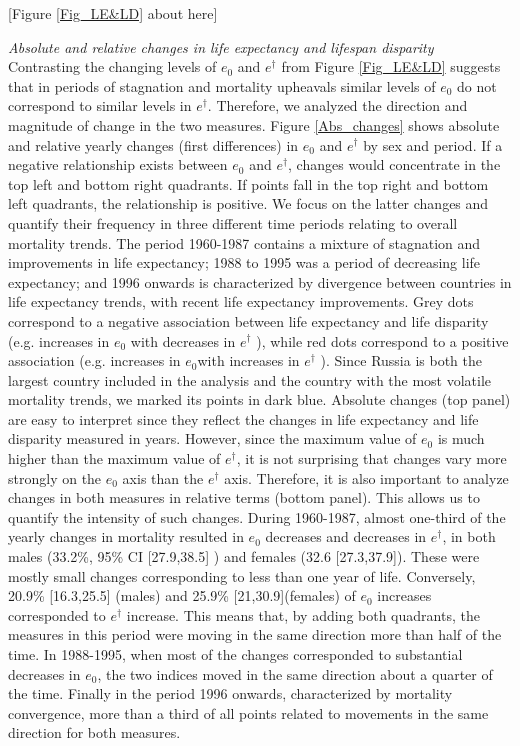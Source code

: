 \documentclass{article}
\begin{document}
\begin{spacing}{1.5}
\begin{center}
[Figure \ref{Fig_LE&LD} about here]
\end{center}

\emph{Absolute and relative changes in life expectancy and lifespan disparity}\\

Contrasting the changing levels of $e_0$ and $e^\dagger$ from Figure \ref{Fig_LE&LD} suggests that in periods of stagnation and mortality upheavals  similar levels of $e_0$ do not correspond to similar levels in $e^\dagger$. Therefore, we analyzed the direction and magnitude of change in the two measures. 
Figure \ref{Abs_changes} shows absolute and relative yearly changes (first differences) in $e_0$ and $e^\dagger$ by sex and period. If a negative relationship exists between $e_0$ and $e^\dagger$, changes would concentrate in the top left and bottom right quadrants. If points fall in the top right and bottom left quadrants, the relationship is positive. We focus on the latter changes and quantify their frequency in three different time periods relating to overall mortality trends. The period 1960-1987 contains a mixture of stagnation and improvements in life expectancy; 1988 to 1995 was a period of decreasing life expectancy; and 1996 onwards is characterized by divergence between countries in life expectancy trends, with recent life expectancy improvements. Grey dots correspond to a negative association between life expectancy and life disparity (e.g. increases in $e_0$ with decreases in $e^\dagger$ ), while red dots correspond to a positive association (e.g. increases in $e_0$with increases in $e^\dagger$ ). Since Russia is both the largest country included in the analysis and the country with the most volatile mortality trends, we marked its points in dark blue. Absolute changes (top panel) are easy to interpret since they reflect the changes in life expectancy and life disparity measured in years. However, since the maximum value of $e_0$ is much higher than the maximum value of $e^\dagger$, it is not surprising that changes vary more strongly on the  $e_0$ axis than the $e^\dagger$ axis. Therefore, it is also important to analyze changes in both measures in relative terms (bottom panel).  This allows us to quantify the intensity of such changes.
During 1960-1987, almost one-third of the yearly changes in mortality resulted in $e_0$ decreases and decreases in $e^\dagger$, in both males (33.2\%, 95\% CI [27.9,38.5] ) and females (32.6 [27.3,37.9]). These were mostly small changes corresponding to less than one year of life. Conversely, 20.9\% [16.3,25.5] (males) and 25.9\% [21,30.9](females) of $e_0$ increases corresponded to $e^\dagger$ increase. This means that, by adding both quadrants, the measures in this period were moving in the same direction more than half of the time.  In 1988-1995, when most of the changes corresponded to substantial decreases in $e_0$, the two indices moved in the same direction about a quarter of the time. Finally in the period 1996 onwards, characterized by mortality convergence, more than a third of all points related to movements in the same direction for both measures. 

\end{spacing}
\end{document}
